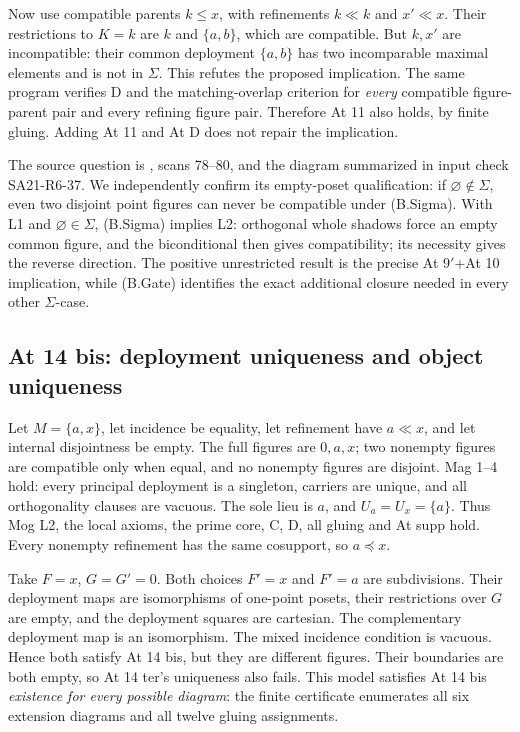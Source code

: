 \begin{counterexample}
Now use compatible parents \(k\leq x\), with refinements
\(k\ll k\) and \(x'\ll x\). Their restrictions to \(K=k\) are
\(k\) and \(\{a,b\}\), which are compatible. But \(k,x'\) are
incompatible: their common deployment \(\{a,b\}\) has two incomparable
maximal elements and is not in \(\Sigma\). This refutes the proposed
implication. The same program verifies D and the matching-overlap
criterion for \emph{every} compatible figure-parent pair and every
refining figure pair. Therefore At 11 also holds, by finite gluing.
Adding At 11 and At D does not repair the implication.
\end{counterexample}

The source question is
, scans 78--80,
and the diagram summarized in input check SA21-R6-37. We independently
confirm its empty-poset qualification: if \(\varnothing\notin\Sigma\),
even two disjoint point figures can never be compatible under
(B.Sigma). With L1 and \(\varnothing\in\Sigma\), (B.Sigma) implies
L2: orthogonal whole shadows force an empty common figure, and the
biconditional then gives compatibility; its necessity gives the
reverse direction. The positive unrestricted result is the precise
At \(9'\)+At 10 implication, while (B.Gate) identifies the exact
additional closure needed in every other \(\Sigma\)-case.

\subsection{At 14 bis: deployment uniqueness and object uniqueness}

\begin{counterexample}
\label{SA21-B-extension-unique}
Let \(M=\{a,x\}\), let incidence be equality, let refinement have
\(a\ll x\), and let internal disjointness be empty. The full figures
are \(0,a,x\); two nonempty figures are compatible only when equal,
and no nonempty figures are disjoint. Mag 1--4 hold: every principal
deployment is a singleton, carriers are unique, and all orthogonality
clauses are vacuous. The sole lieu is \(a\), and
\(U_a=U_x=\{a\}\). Thus Mog L2, the local axioms, the prime core,
C, D, all gluing and At supp hold. Every nonempty refinement has
the same cosupport, so \(a\preceq x\).

Take \(F=x\), \(G=G'=0\). Both choices \(F'=x\) and \(F'=a\)
are subdivisions. Their deployment maps are isomorphisms of
one-point posets, their restrictions over \(G\) are empty, and the
deployment squares are cartesian. The complementary deployment
map is an isomorphism. The mixed incidence condition is vacuous.
Hence both satisfy At 14 bis, but they are different figures.
Their boundaries are both empty, so At 14 ter's uniqueness also
fails. This model satisfies At 14 bis \emph{existence for every
possible diagram}: the finite certificate enumerates all six
extension diagrams and all twelve gluing assignments.
\end{counterexample}

